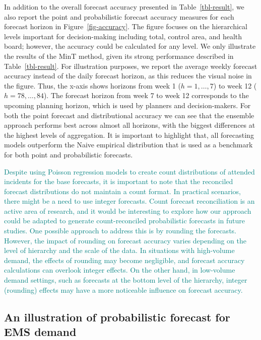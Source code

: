\documentclass[
  authoryear,
  preprint,
  3p]{elsarticle}
\begin{document}
In addition to the overall forecast accuracy presented in
Table~\ref{tbl-result}, we also report the point and probabilistic
forecast accuracy measures for each forecast horizon in
Figure~\ref{fig-accuracy}. The figure focuses on the hierarchical levels
important for decision-making including total, control area, and health
board; however, the accuracy could be calculated for any level. We only
illustrate the results of the MinT method, given its strong performance
described in Table~\ref{tbl-result}. For illustration purposes, we
report the average weekly forecast accuracy instead of the daily
forecast horizon, as this reduces the visual noise in the figure. Thus,
the x-axis shows horizons from week 1 (\(h= 1,\dots,7\)) to week 12
(\(h= 78,\dots,84\)). The forecast horizon from week 7 to week 12
corresponds to the upcoming planning horizon, which is used by planners
and decision-makers. For both the point forecast and distributional
accuracy we can see that the ensemble approach performs best across
almost all horizons, with the biggest differences at the highest levels
of aggregation. It is important to highlight that, all forecasting
models outperform the Naive empirical distribution that is used as a
benchmark for both point and probabilistic forecasts.

\textcolor{teal}{Despite using Poisson regression models to create count distributions of attended incidents for the base forecasts, it is important to note that the reconciled forecast distributions do not maintain a count format. In practical scenarios, there might be a need to use integer forecasts. Count forecast reconciliation is an active area of research, and it would be interesting to explore how our approach could be adapted to generate count-reconciled probabilistic forecasts in future studies. One possible approach to address this is by rounding the forecasts. However, the impact of rounding on forecast accuracy varies depending on the level of hierarchy and the scale of the data. In situations with high-volume demand, the effects of rounding may become negligible, and forecast accuracy calculations can overlook integer effects. On the other hand, in low-volume demand settings, such as forecasts at the bottom level of the hierarchy, integer (rounding) effects may have a more noticeable influence on forecast accuracy.}

\hypertarget{an-illustration-of-probabilistic-forecast-for-ems-demand}{%
\subsection{An illustration of probabilistic forecast for EMS
demand}\label{an-illustration-of-probabilistic-forecast-for-ems-demand}}
\end{document}

